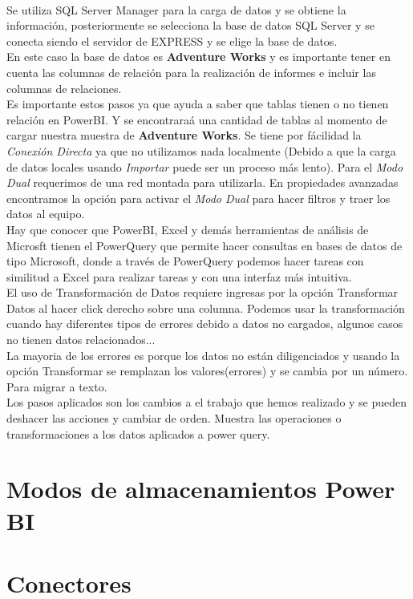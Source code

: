 \documentclass[a4paper]{report} %
\begin{document}
              \\Se utiliza SQL Server Manager para la carga de datos y se obtiene la información, posteriormente se selecciona la base de datos SQL Server y se conecta siendo el servidor de EXPRESS y se elige la base de datos.
              \\En este caso la base de datos es \textbf{Adventure Works} y es importante tener en cuenta las columnas de relación para la realización de informes e incluir las columnas de relaciones.
              \\Es importante estos pasos ya que ayuda a saber que tablas tienen o no tienen relación en PowerBI. Y se encontraraá una cantidad de tablas al momento de cargar nuestra muestra de \textbf{Adventure Works}. Se tiene por fácilidad la \textit{Conexión Directa} ya que no utilizamos nada localmente (Debido a que la carga de datos locales usando \textit{Importar} puede ser un proceso más lento). Para el \textit{Modo Dual} requerimos de una red montada para utilizarla. En propiedades avanzadas encontramos la opción para activar el \textit{Modo Dual} para hacer filtros y traer los datos al equipo.
              \\Hay que conocer que PowerBI, Excel y demás herramientas de análisis de Microsft tienen el PowerQuery que permite hacer consultas en bases de datos de tipo Microsoft, donde a través de PowerQuery podemos hacer tareas con similitud a Excel para realizar tareas y con una interfaz más intuitiva.
              \\El uso de Transformación de Datos requiere ingresas por la opción Transformar Datos al hacer click derecho sobre una columna. Podemos usar la transformación cuando hay diferentes tipos de errores debido a datos no cargados, algunos casos no tienen datos relacionados...
              \\La mayoria de los errores es porque los datos no están diligenciados y usando la opción Transformar se remplazan los valores(errores) y se cambia por un número. Para migrar a texto.
              \\Los pasos aplicados son los cambios a el trabajo que hemos realizado y se pueden deshacer las acciones y cambiar de orden. Muestra las operaciones o transformaciones a los datos aplicados a power query.
        \section{Modos de almacenamientos Power BI}
        \section{Conectores}
\end{document}
